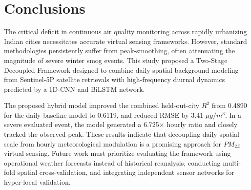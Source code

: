 \section{Conclusions}

The critical deficit in continuous air quality monitoring across rapidly urbanizing Indian cities necessitates accurate virtual sensing frameworks. However, standard methodologies persistently suffer from peak-smoothing, often attenuating the magnitude of severe winter smog events. This study proposed a Two-Stage Decoupled Framework designed to combine daily spatial background modeling from Sentinel-5P satellite retrievals with high-frequency diurnal dynamics predicted by a 1D-CNN and BiLSTM network.

The proposed hybrid model improved the combined held-out-city $R^2$ from 0.4890 for the daily-baseline model to 0.6119, and reduced RMSE by 3.41 $\mu g/m^3$. In a severe evaluated event, the model generated a 6.725$\times$ hourly ratio and closely tracked the observed peak. These results indicate that decoupling daily spatial scale from hourly meteorological modulation is a promising approach for $PM_{2.5}$ virtual sensing. Future work must prioritize evaluating the framework using operational weather forecasts instead of historical reanalysis, conducting multi-fold spatial cross-validation, and integrating independent sensor networks for hyper-local validation.
